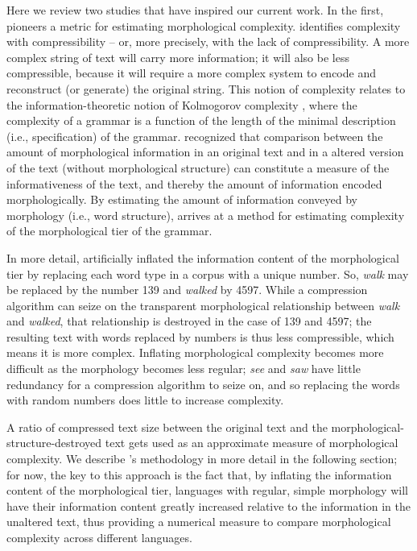 \documentclass[output=paper]{langscibook}
\begin{document}
Here we review two studies that have inspired our current work. In the first, \citet{juola1998measuring} pioneers a metric for estimating morphological complexity. \citeauthor{juola1998measuring} identifies complexity with compressibility -- or, more precisely, with the lack of compressibility. A more complex string of text will carry more information; it will also be less compressible, because it will require a more complex system to encode and reconstruct (or generate) the original string. This notion of complexity relates to the information-theoretic notion of Kolmogorov complexity \citep{kolmogorov1968,livitanyi2008}, where the complexity of a grammar is a function of the length of the minimal description (i.e., specification) of the grammar. \citeauthor{juola1998measuring} recognized that comparison between the amount of morphological information in an original text and in a altered version of the text (without morphological structure) can constitute a measure of the informativeness of the text, and thereby the amount of information encoded morphologically. By estimating the amount of information conveyed by morphology (i.e., word structure), \citeauthor{juola1998measuring} arrives at a method for estimating complexity of the morphological tier of the grammar.

In more detail, \citeauthor{juola1998measuring} artificially inflated the information content of the morphological tier by replacing each word type in a corpus with a unique number. So, \emph{walk} may be replaced by the number 139 and \emph{walked} by 4597. While a compression algorithm can seize on the transparent morphological relationship between \emph{walk} and \emph{walked}, that relationship is destroyed in the case of 139 and 4597; the resulting text with words replaced by numbers is thus less compressible, which means it is more complex. Inflating morphological complexity becomes more difficult as the morphology becomes less regular; \emph{see} and \emph{saw} have little redundancy for a compression algorithm to seize on, and so replacing the words with random numbers does little to increase complexity. 

A ratio of compressed text size between the original text and the mor\-phol\-og\-i\-cal-struc\-ture-de\-stroyed text gets used as an approximate measure of morphological complexity. We describe \citeauthor{juola1998measuring}'s methodology in more detail in the following section; for now, the key to this approach is the fact that, by inflating the information content of the morphological tier, languages with regular, simple morphology will have their information content greatly increased relative to the information in the unaltered text, thus providing a numerical measure to compare morphological complexity across different languages. 
\end{document}
